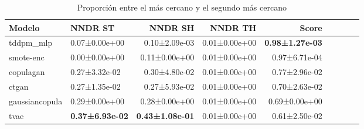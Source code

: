\begin{table}[H]
\centering
\fontsize{10}{14}\selectfont
\caption{Proporción entre el más cercano y el segundo más cercano}
\label{table-dcr-economicos-a}
\begin{tabular}{|l|l|r|r|r|r|r|r|r|}
\hline
\rowcolor[gray]{0.8}
Modelo & NNDR ST & NNDR SH & NNDR TH & \textbf{Score} \\
\hline tddpm\_mlp & 0.07±0.00e+00 & \cellcolor[rgb]{0.9, 0.54, 0.52} 0.10±2.09e-03 & 0.01±0.00e+00 & \bfseries 0.98±1.27e-03 \\
\hline smote-enc & \cellcolor[rgb]{0.9, 0.54, 0.52} 0.00±0.00e+00 & 0.11±0.00e+00 & 0.01±0.00e+00 & 0.97±6.71e-04 \\
\hline copulagan & 0.27±3.32e-02 & 0.30±4.80e-02 & 0.01±0.00e+00 & 0.77±2.96e-02 \\
\hline ctgan & 0.27±1.35e-02 & 0.27±5.93e-02 & 0.01±0.00e+00 & 0.70±2.63e-02 \\
\hline gaussiancopula & 0.29±0.00e+00 & 0.28±0.00e+00 & 0.01±0.00e+00 & 0.69±0.00e+00 \\
\hline tvae & \bfseries 0.37±6.93e-02 & \bfseries 0.43±1.08e-01 & 0.01±0.00e+00 & \cellcolor[rgb]{0.9, 0.54, 0.52} 0.61±2.50e-02 \\
\hline
\end{tabular}
\end{table}

